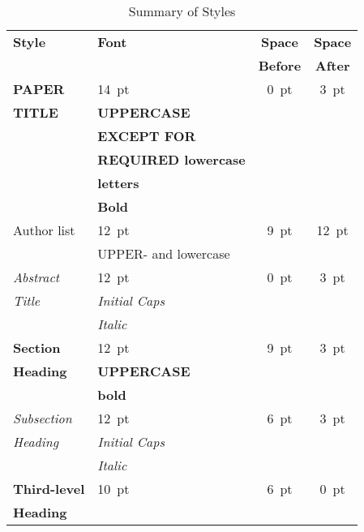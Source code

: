 \documentclass[a4paper,
               keeplastbox,   %
               ]{jacow}
\begin{document}
  \begin{table}[h!b]
	\setlength\tabcolsep{3.5pt}
	\centering
	\caption{Summary of Styles}
	\label{tab:styles}
	\begin{tabular}{llcc}
		\toprule
		\textbf{Style} & \textbf{Font}               & \textbf{Space}  & \textbf{Space} \\
		&                             & \textbf{Before} & \textbf{After} \\
		\midrule
		\textbf{PAPER}  & \SI{14}{pt}                 & \SI{0}{pt}      & \SI{3}{pt}  \\
		\textbf{TITLE}  & \textbf{UPPERCASE}          &                 &      \\
		& \textbf{EXCEPT FOR}         &                 &      \\
		& \textbf{REQUIRED lowercase} &                 &      \\
		& \textbf{letters}            &                 &      \\
		& \textbf{Bold}               &                 &      \\[5pt]
		Author list  & \SI{12}{pt}                 & \SI{9}{pt}      & \SI{12}{pt} \\
		& UPPER- and lowercase        &                 &      \\[5pt]
		\textit{Abstract} & \SI{12}{pt}                 & \SI{0}{pt}      & \SI{3}{pt} \\
		\textit{Title}  & \textit{Initial Caps}       &                 &      \\
		& \textit{Italic}             &                 &      \\[5pt]
		\textbf{Section}  & \SI{12}{pt}                 & \SI{9}{pt}      & \SI{3}{pt}  \\
		\textbf{Heading}  & \textbf{UPPERCASE}          &                 &      \\
		& \textbf{bold}               &                 &      \\[5pt]
		\textit{Subsection} & \SI{12}{pt}                 & \SI{6}{pt}      & \SI{3}{pt}  \\
		\textit{Heading}
                             & \textit{Initial Caps}       &                 &      \\
		& \textit{Italic}             &                 &      \\[5pt]
		\textbf{Third-level} & \SI{10}{pt}                 & \SI{6}{pt}      & \SI{0}{pt}  \\
		\textbf{Heading}     

\end{tabular}
\end{table}
\end{document}
